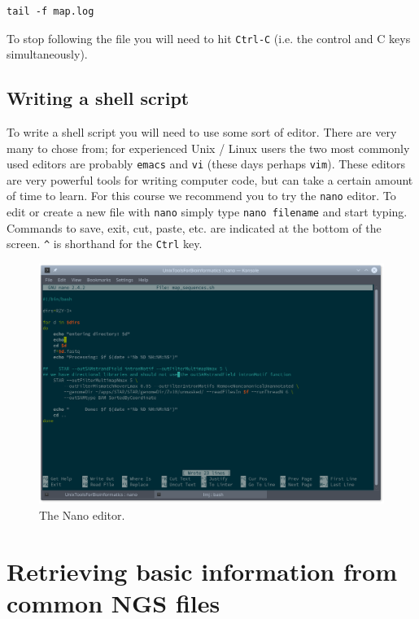 \documentclass[11pt]{article}
\begin{document}
\begin{verbatim}
tail -f map.log
\end{verbatim}

To stop following the file you will need to hit \texttt{Ctrl-C} (i.e. the
control and C keys simultaneously).

\subsection{Writing a shell script}
\label{sec:orgheadline18}
To write a shell script you will need to use some sort of editor. There are
very many to chose from; for experienced Unix / Linux users the two most
commonly used editors are probably \texttt{emacs} and \texttt{vi} (these days perhaps
\texttt{vim}). These editors are very powerful tools for writing computer code, but
can take a certain amount of time to learn. For this course we recommend you
to try the \texttt{nano} editor. To edit or create a new file with \texttt{nano} simply
type \texttt{nano filename} and start typing. Commands to save, exit, cut, paste,
etc. are indicated at the bottom of the screen. \texttt{\textasciicircum{}} is shorthand for the
\texttt{Ctrl} key.

\begin{figure}[htb]
\centering
\includegraphics[width=.9\linewidth]{nanoShell.png}
\caption{\label{fig:orgparagraph3}
The Nano editor.}
\end{figure}

\section{Retrieving basic information from common NGS files}
\label{sec:orgheadline25}
\end{document}
